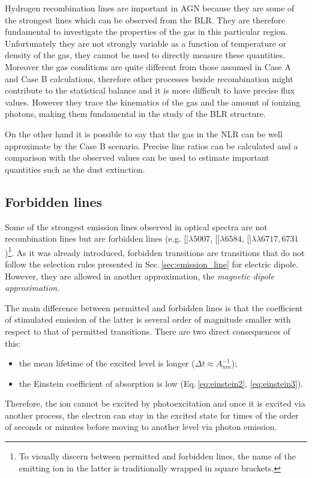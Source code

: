 \documentclass[../main.tex]{subfiles}
\begin{document}
Hydrogen recombination lines are important in AGN because they are some of the strongest lines which can be observed from the BLR.
They are therefore fundamental to investigate the properties of the gas in this particular region.
Unfortunately they are not strongly variable as a function of temperature or density of the gas, they cannot be used to directly measure these quantities.
Moreover the gas conditions are quite different from those assumed in Case A and Case B calculations, therefore other processes beside recombination might contribute to the statistical balance and it is more difficult to have precise flux values.
However they trace the kinematics of the gas and the amount of ionizing photons, making them fundamental in the study of the BLR structure.

On the other hand it is possible to say that the gas in the NLR can be well approximate by the Case B scenario.
Precise line ratios can be calculated and a comparison with the observed values can be used to estimate important quantities such as the dust extinction.
 
\subsection{Forbidden lines}
\label{sec:forb_line}

Some of the strongest emission lines observed in optical spectra are not recombination lines but are forbidden lines (e.g. []$\lambda5007$, []$\lambda6584$, []$\lambda\lambda6717,6731$)\footnote{To visually discern between permitted and forbidden lines, the name of the emitting ion in the latter is traditionally wrapped in square brackets.}.
As it was already introduced, forbidden transitions are transitions that do not follow the selection rules presented in Sec.\,\ref{sec:emission_line} for electric dipole.
However, they are allowed in another approximation, the \emph{magnetic dipole approximation}.

The main difference between permitted and forbidden lines is that the coefficient of stimulated emission of the latter is several order of magnitude smaller with respect to that of permitted transitions.
There are two direct consequences of this:
\begin{itemize}
    \item the mean lifetime of the excited level is longer ($\Delta t \approx A_{nm}^{-1}$);
    \item the Einstein coefficient of absorption is low (Eq.\,\ref{eq:einstein2}, \ref{eq:einstein3}).
\end{itemize}
Therefore, the ion cannot be excited by photoexcitation and once it is excited via another process, the electron can stay in the excited state for times of the order of seconds or minutes before moving to another level via photon emission.
\end{document}
